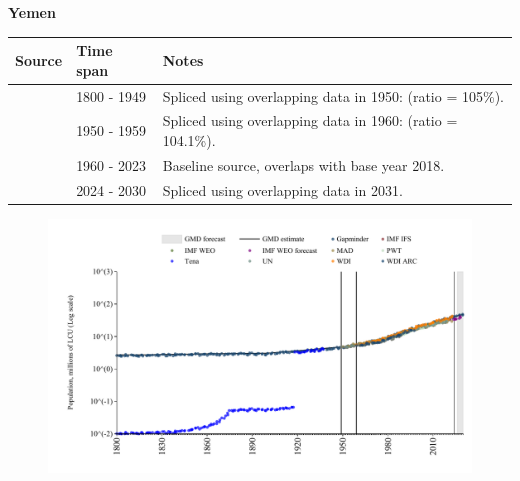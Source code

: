 \documentclass[12pt,a4paper,landscape]{article}
\begin{document}
\begin{adjustbox}{max totalsize={\paperwidth}{\paperheight},center}
\begin{minipage}[t][\textheight][t]{\textwidth}
\vspace*{0.5cm}
{}
\begin{center}
{\Large\bfseries Yemen}
\end{center}
\vspace{0.5cm}
\begin{table}[H]
\centering
\small
\begin{tabular}{|l|l|l|}
\hline
\textbf{Source} & \textbf{Time span} & \textbf{Notes} \\
\hline
\rowcolor{white}\cite{Gapminder}& 1800 - 1949 &Spliced using overlapping data in 1950: (ratio = 105\%).\\
\rowcolor{lightgray}\cite{IMF_IFS}& 1950 - 1959 &Spliced using overlapping data in 1960: (ratio = 104.1\%).\\
\rowcolor{white}\cite{WDI}& 1960 - 2023 &Baseline source, overlaps with base year 2018.\\
\rowcolor{lightgray}\cite{Gapminder}& 2024 - 2030 &Spliced using overlapping data in 2031.\\
\hline
\end{tabular}
\end{table}
\begin{figure}[H]
\centering
\includegraphics[width=\textwidth,height=0.6\textheight,keepaspectratio]{graphs/YEM_pop.pdf}
\end{figure}
\end{minipage}
\end{adjustbox}
\end{document}
